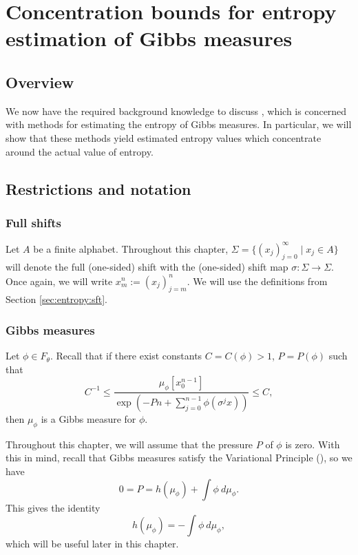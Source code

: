 \chapter[Concentration bounds for entropy estimation]{Concentration bounds for entropy estimation of Gibbs measures}\label{chap:concentration-bounds}
\section{Overview}
We now have the required background knowledge to discuss \cite{chazottes-maldonado:cbfee}, which is concerned with methods for estimating the entropy of Gibbs measures. In particular, we will show that these methods yield estimated entropy values which concentrate around the actual value of entropy.

\section{Restrictions and notation}
\subsection{Full shifts}
Let $A$ be a finite alphabet. Throughout this chapter, $\Sigma = \{(x_j)_{j = 0}^\infty \mid x_j \in A\}$ will denote the full (one-sided) shift with the (one-sided) shift map $\sigma : \Sigma \to \Sigma$. Once again, we will write $x_m^n := (x_j)_{j = m}^n$. We will use the definitions from Section \ref{sec:entropy:sft}.

\subsection{Gibbs measures}
Let $\phi \in F_\theta$. Recall that if there exist constants $C = C(\phi) > 1$, $P = P(\phi)$ such that
\[
	C^{-1} \leq \frac{\mu_\phi[x_0^{n - 1}]}{\exp\left(-Pn + \sum_{j = 0}^{n - 1}{\phi(\sigma^j x)}\right)} \leq C,
\]
then $\mu_\phi$ is a Gibbs measure for $\phi$.

Throughout this chapter, we will assume that the pressure $P$ of $\phi$ is zero. With this in mind, recall that
Gibbs measures satisfy the Variational Principle (), so we have
\[
	0 = P = h(\mu_\phi) + \int{\phi\ d\mu_\phi}.
\]
This gives the identity
\begin{equation}\label{fml:vp-identity}
	h(\mu_\phi) = -\int{\phi\ d\mu_\phi},
\end{equation}
which will be useful later in this chapter.

